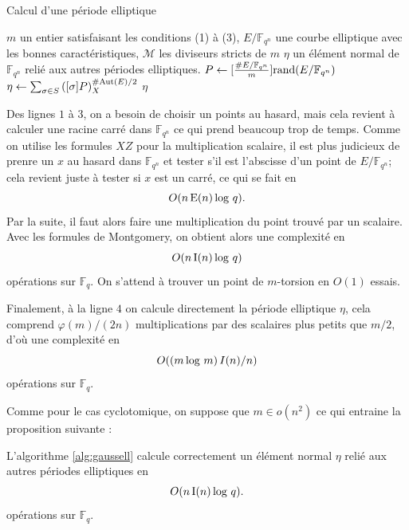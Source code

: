 \documentclass[a4paper]{article} %
\numberwithin{section}{part}
\numberwithin{equation}{section}
\newcommand\GF[1]{\mathbb{F}_{#1}}
\newcommand\EO{\mathcal{O}}
\newcommand\E[1]{\textup{E}(#1)}
\newcommand\I[1]{\textup{I}(#1)}
\begin{document}
\begin{algorithm}
\caption{Calcul d'une période elliptique}
\label{alg:gaussell}
\begin{algorithmic}[1]
\REQUIRE $m$ un entier satisfaisant les conditions (1) à (3), $E/\GF{q^n}$ une 
courbe elliptique avec les bonnes caractéristiques, $\mathcal{M}$ les diviseurs
stricts de $m$
\ENSURE $\eta$ un élément normal de $\GF{q^n}$ relié aux autres périodes
elliptiques.
\bigskip
\REPEAT
    \STATE $P \leftarrow [\frac{\#E/\GF{q^n}}{m}]\textup{rand}(E/\GF{q^n})$
\UNTIL{$[m]P = \EO\quad\&\quad[d]P\neq\EO\quad\forall d\in\mathcal{M}$}
\STATE $\eta \leftarrow \sum_{\sigma\in
S}{\left([\sigma]P\right)_X^{\#\textup{Aut}(E)/2}}$
\RETURN $\eta$
\end{algorithmic}
\end{algorithm}

Des lignes $1$ à $3$, on a besoin de choisir un points au hasard, mais cela 
revient à calculer une racine carré dans $\GF{q^n}$ ce qui prend beaucoup trop
de temps. Comme on utilise les formules $XZ$ pour la
multiplication scalaire, il est plus judicieux de prenre un $x$ au hasard dans 
$\GF{q^n}$ et tester s'il est l'abscisse d'un point de $E/\GF{q^n}$; cela 
revient juste à tester si $x$ est un carré, ce qui se fait en 
\begin{equation}
O(n\,\E{n}\,\textup{log }q).
\end{equation}
Par la suite, il faut alors faire une multiplication
du point trouvé par un scalaire. Avec les formules de Montgomery, on obtient
alors une complexité en 
\begin{equation}
O(n\,\I{n}\,\textup{log }q)
\end{equation}
opérations sur $\GF{q}$. On s'attend à trouver un point de $m$-torsion en $O(1)$
essais.\par
Finalement, à la ligne $4$ on calcule directement la période elliptique $\eta$,
cela comprend $\varphi(m)/(2n)$ multiplications par des scalaires plus petits
que $m/2$, d'où une complexité en 
\begin{equation}
O((m\,\textup{log }m)\,I(n)/n)
\end{equation}
opérations sur $\GF{q}$.\par
Comme pour le cas cyclotomique, on suppose que $m\in o(n^2)$ ce qui entraine la
proposition suivante :


\begin{prop}
L'algorithme \ref{alg:gaussell} calcule correctement un élément normal $\eta$ 
relié aux autres périodes elliptiques en
\begin{equation}
O(n\,\I{n}\,\textup{log }q).
\end{equation}
opérations sur $\GF{q}$.
\end{prop}
\newpage
\end{document}
